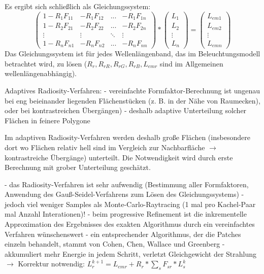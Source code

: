 \documentclass[10pt,landscape]{article}
\begin{document}
\begin{multicols}{3}
  Es ergibt sich schließlich als Gleichungssystem:
  $$ \begin{pmatrix} 1-R_1F_{11} & -R_1F_{12} &...& -R_1F_{1n}\\ 1-R_2F_{21} & -R_2F_{22} &...& -R_2F_{2n}\\ \vdots & \vdots & \ddots & \vdots \\ 1-R_nF_{n1} & -R_nF_{n2} &...& -R_nF_{nn} \end{pmatrix} * \begin{pmatrix} L_1\\L_2\\\vdots\\L_n \end{pmatrix} = \begin{pmatrix} L_{em1}\\L_{em2}\\\vdots\\L_{emn} \end{pmatrix}$$
  Das Gleichungssystem ist für jedes Wellenlängenband, das im Beleuchtungsmodell betrachtet wird, zu lösen ($R_r, R_{rR}, R_{rG}, R_{rB}, L_{emr}$ sind im Allgemeinen wellenlängenabhängig).
  
  Adaptives Radiosity-Verfahren:
  - vereinfachte Formfaktor-Berechnung ist ungenau bei eng beieinander liegenden Flächenstücken (z. B. in der Nähe von Raumecken), oder bei kontrastreichen Übergängen)
  - deshalb adaptive Unterteilung solcher Flächen in feinere Polygone
  
  Im adaptiven Radiosity-Verfahren werden deshalb große Flächen (insbesondere dort wo Flächen relativ hell sind im Vergleich zur Nachbarfläche $\rightarrow$ kontrastreiche Übergänge) unterteilt. Die Notwendigkeit wird durch erste Berechnung mit grober Unterteilung geschätzt.
  
  - das Radiosity-Verfahren ist sehr aufwendig (Bestimmung aller Formfaktoren, Anwendung des Gauß-Seidel-Verfahrens zum Lösen des Gleichungssystems)
  - jedoch viel weniger Samples als Monte-Carlo-Raytracing (1 mal pro Kachel-Paar mal Anzahl Interationen)!
  - beim progressive Refinement ist die inkrementelle Approximation des Ergebnisses des exakten Algorithmus durch ein vereinfachtes Verfahren wünschenswert
  - ein entsprechender Algorithmus, der die Patches einzeln behandelt, stammt von Cohen, Chen, Wallace und Greenberg
  - akkumuliert mehr Energie in jedem Schritt, verletzt Gleichgewicht der Strahlung $\rightarrow$ Korrektur notwendig:
  $L_r^{k+1}=L_{emr} + R_r*\sum_s F_{sr}* L_s^k$
  

\end{multicols}
\end{document}
